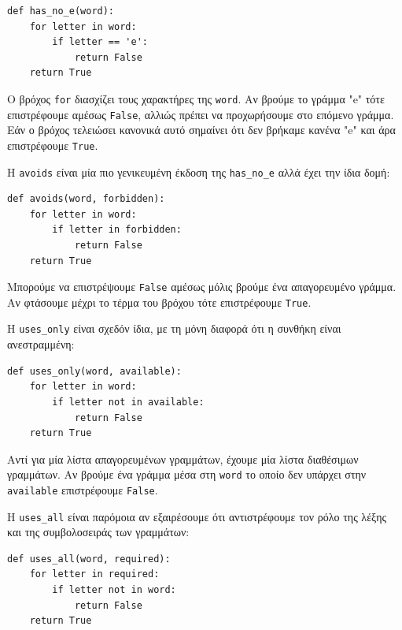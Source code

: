 \documentclass[10pt]{book}
\begin{document}
\begin{verbatim}
def has_no_e(word):
    for letter in word:
        if letter == 'e':
            return False
    return True
\end{verbatim}
%

Ο βρόχος {\tt for} διασχίζει τους χαρακτήρες της {\tt word}. Αν βρούμε το γράμμα "e" τότε επιστρέφουμε αμέσως {\tt False}, αλλιώς πρέπει να προχωρήσουμε στο επόμενο γράμμα. Εάν ο βρόχος τελειώσει κανονικά αυτό σημαίνει ότι δεν βρήκαμε κανένα "e" και άρα επιστρέφουμε {\tt True}.



Η {\tt avoids} είναι μία πιο γενικευμένη έκδοση της \verb"has_no_e"
αλλά έχει την ίδια δομή:

\begin{verbatim}
def avoids(word, forbidden):
    for letter in word:
        if letter in forbidden:
            return False
    return True
\end{verbatim}
%

Μπορούμε να επιστρέψουμε {\tt False} αμέσως μόλις βρούμε ένα απαγορευμένο γράμμα. Αν φτάσουμε μέχρι το τέρμα του βρόχου τότε επιστρέφουμε {\tt True}.

Η \verb"uses_only" είναι σχεδόν ίδια, με τη μόνη διαφορά ότι η συνθήκη είναι ανεστραμμένη:

\begin{verbatim}
def uses_only(word, available):
    for letter in word:
        if letter not in available:
            return False
    return True
\end{verbatim}
%

Αντί για μία λίστα απαγορευμένων γραμμάτων, έχουμε μία λίστα διαθέσιμων γραμμάτων. Αν βρούμε ένα γράμμα μέσα στη {\tt word} το οποίο δεν υπάρχει στην  {\tt available} επιστρέφουμε {\tt False}.

Η \verb"uses_all" είναι παρόμοια αν εξαιρέσουμε ότι αντιστρέφουμε τον ρόλο της λέξης και της συμβολοσειράς των γραμμάτων:

\begin{verbatim}
def uses_all(word, required):
    for letter in required:
        if letter not in word:
            return False
    return True
\end{verbatim}
%
\end{document}
